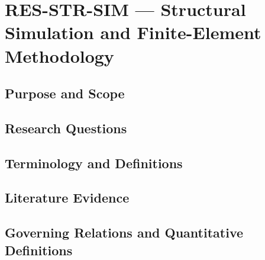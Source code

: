 
\section{RES-STR-SIM --- Structural Simulation and Finite-Element Methodology}
\label{sec:res-str-sim}

\subsection{Purpose and Scope}
\label{sec:res-str-sim-purpose}


\subsection{Research Questions}
\label{sec:res-str-sim-research-questions}


\subsection{Terminology and Definitions}
\label{sec:res-str-sim-definitions}


\subsection{Literature Evidence}
\label{sec:res-str-sim-literature-evidence}

%

\subsection{Governing Relations and Quantitative Definitions}
\label{sec:res-str-sim-governing-relations}

